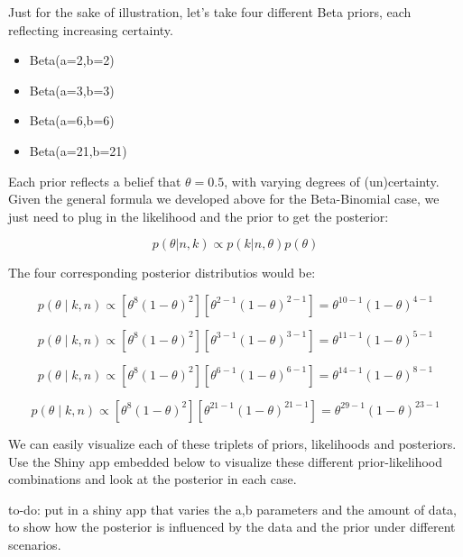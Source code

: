 \documentclass[12pt,]{krantz}
\makeatletter
\providecommand{\tightlist}{%
  \setlength{\itemsep}{0pt}\setlength{\parskip}{0pt}}
\newenvironment{kframe}{%
\medskip{}
\setlength{\fboxsep}{.8em}
 \def\at@end@of@kframe{}%
 \ifinner\ifhmode%
  \def\at@end@of@kframe{\end{minipage}}%
  \begin{minipage}{\columnwidth}%
 \fi\fi%
 \def\FrameCommand##1{\hskip\@totalleftmargin \hskip-\fboxsep
 \colorbox{shadecolor}{##1}\hskip-\fboxsep
     \hskip-\linewidth \hskip-\@totalleftmargin \hskip\columnwidth}%
 \MakeFramed {\advance\hsize-\width
   \@totalleftmargin\z@ \linewidth\hsize
   \@setminipage}}%
 {\par\unskip\endMakeFramed%
 \at@end@of@kframe}
\newenvironment{rmdblock}[1]
  {
  \begin{itemize}
  \renewcommand{\labelitemi}{
    \raisebox{-.7\height}[0pt][0pt]{
      {\setkeys{Gin}{width=3em,keepaspectratio}\texttt{[image: images/\#1]}}
    }
  }
  \setlength{\fboxsep}{1em}
  \begin{kframe}
  \item
  }
  {
  \end{kframe}
  \end{itemize}
  }
\newenvironment{rmdnote}
  {\begin{rmdblock}{note}}
  {\end{rmdblock}}
\theoremstyle{definition}
\theoremstyle{definition}
\theoremstyle{definition}
\theoremstyle{remark}
\makeatother
\begin{document}
Just for the sake of illustration, let's take four different Beta
priors, each reflecting increasing certainty.

\begin{itemize}
\tightlist
\item
  Beta(a=2,b=2)
\item
  Beta(a=3,b=3)
\item
  Beta(a=6,b=6)
\item
  Beta(a=21,b=21)
\end{itemize}

Each prior reflects a belief that \(\theta=0.5\), with varying degrees
of (un)certainty. Given the general formula we developed above for the
Beta-Binomial case, we just need to plug in the likelihood and the prior
to get the posterior:

\begin{equation}
p(\theta | n,k) \propto p(k |n,\theta) p(\theta)
\end{equation}

The four corresponding posterior distributios would be:

\begin{equation}
p(\theta\mid k,n) \propto [\theta^{8} (1-\theta)^{2}] [\theta^{2-1}(1-\theta)^{2-1}] = \theta^{10-1} (1-\theta)^{4-1}
\end{equation}

\begin{equation}
p(\theta\mid k,n) \propto [\theta^{8} (1-\theta)^{2}] [\theta^{3-1}(1-\theta)^{3-1}] = \theta^{11-1} (1-\theta)^{5-1}
\end{equation}

\begin{equation}
p(\theta\mid k,n) \propto [\theta^{8} (1-\theta)^{2}] [\theta^{6-1}(1-\theta)^{6-1}] = \theta^{14-1} (1-\theta)^{8-1}
\end{equation}

\begin{equation}
p(\theta\mid k,n) \propto [\theta^{8} (1-\theta)^{2}] [\theta^{21-1}(1-\theta)^{21-1}] = \theta^{29-1} (1-\theta)^{23-1}
\end{equation}

We can easily visualize each of these triplets of priors, likelihoods
and posteriors. Use the Shiny app embedded below to visualize these
different prior-likelihood combinations and look at the posterior in
each case.

\begin{rmdnote} to-do: put in a shiny app that varies the a,b
parameters and the amount of data, to show how the posterior is
influenced by the data and the prior under different scenarios.
\end{rmdnote}
\end{document}

